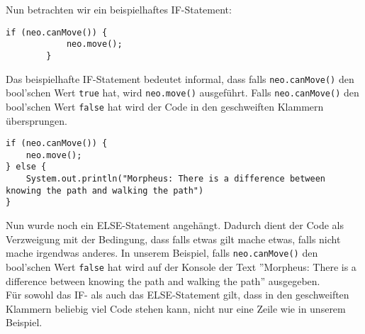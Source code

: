\begin{Infobox}[IF-Verzweigung]
    Nun betrachten wir ein beispielhaftes IF-Statement:

    \begin{lstlisting}[breaklines=true, numbers=none]
        if (neo.canMove()) {
            neo.move();
        } 
    \end{lstlisting}

    Das beispielhafte IF-Statement bedeutet informal, dass falls \lstinline{neo.canMove()} den bool'schen Wert \lstinline{true} hat, wird \lstinline{neo.move()} ausgeführt. Falls \lstinline{neo.canMove()} den bool'schen Wert \lstinline{false} hat wird der Code in den geschweiften Klammern übersprungen.

    \begin{lstlisting}[breaklines=true, numbers=none]
if (neo.canMove()) {
    neo.move();
} else {
    System.out.println("Morpheus: There is a difference between knowing the path and walking the path")
}
    \end{lstlisting}

    Nun wurde noch ein ELSE-Statement angehängt. Dadurch dient der Code als Verzweigung mit der Bedingung, dass falls etwas gilt mache etwas, falls nicht mache irgendwas anderes. In unserem Beispiel, falls \lstinline{neo.canMove()} den bool'schen Wert \lstinline{false} hat wird auf der Konsole der Text ''Morpheus: There is a difference between knowing the path and walking the path'' ausgegeben.\\

    Für sowohl das IF- als auch das ELSE-Statement gilt, dass in den geschweiften Klammern beliebig viel Code stehen kann, nicht nur eine Zeile wie in unserem Beispiel.
\end{Infobox}


